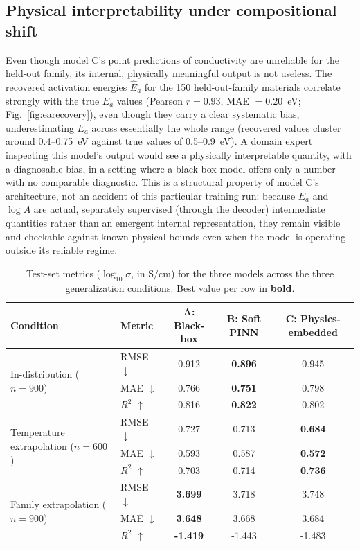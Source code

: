 \documentclass[11pt]{article}
\begin{document}
\subsection{Physical interpretability under compositional shift}

Even though model C's point predictions of conductivity are unreliable for the held-out family, its internal, physically meaningful output is not useless. The recovered activation energies $\hat E_a$ for the 150 held-out-family materials correlate strongly with the true $E_a$ values (Pearson $r = 0.93$, MAE $= 0.20$~eV; Fig.~\ref{fig:earecovery}), even though they carry a clear systematic bias, underestimating $E_a$ across essentially the whole range (recovered values cluster around 0.4–0.75~eV against true values of 0.5–0.9~eV). A domain expert inspecting this model's output would see a physically interpretable quantity, with a diagnosable bias, in a setting where a black-box model offers only a number with no comparable diagnostic. This is a structural property of model C's architecture, not an accident of this particular training run: because $E_a$ and $\log A$ are actual, separately supervised (through the decoder) intermediate quantities rather than an emergent internal representation, they remain visible and checkable against known physical bounds even when the model is operating outside its reliable regime.

\begin{table}[t]
\centering
\small
\caption{Test-set metrics ($\log_{10}\sigma$, in $\mathrm{S/cm}$) for the three models across the three generalization conditions. Best value per row in \textbf{bold}.}
\label{tab:results}
\begin{tabular}{llccc}
\toprule
Condition & Metric & A: Black-box & B: Soft PINN & C: Physics-embedded \\
\midrule
\multirow{3}{*}{In-distribution ($n=900$)}
  & RMSE $\downarrow$ & 0.912 & \textbf{0.896} & 0.945 \\
  & MAE $\downarrow$  & 0.766 & \textbf{0.751} & 0.798 \\
  & $R^2$ $\uparrow$  & 0.816 & \textbf{0.822} & 0.802 \\
\midrule
\multirow{3}{*}{Temperature extrapolation ($n=600$)}
  & RMSE $\downarrow$ & 0.727 & 0.713 & \textbf{0.684} \\
  & MAE $\downarrow$  & 0.593 & 0.587 & \textbf{0.572} \\
  & $R^2$ $\uparrow$  & 0.703 & 0.714 & \textbf{0.736} \\
\midrule
\multirow{3}{*}{Family extrapolation ($n=900$)}
  & RMSE $\downarrow$ & \textbf{3.699} & 3.718 & 3.748 \\
  & MAE $\downarrow$  & \textbf{3.648} & 3.668 & 3.684 \\
  & $R^2$ $\uparrow$  & \textbf{-1.419} & -1.443 & -1.483 \\
\bottomrule
\end{tabular}
\end{table}
\end{document}
